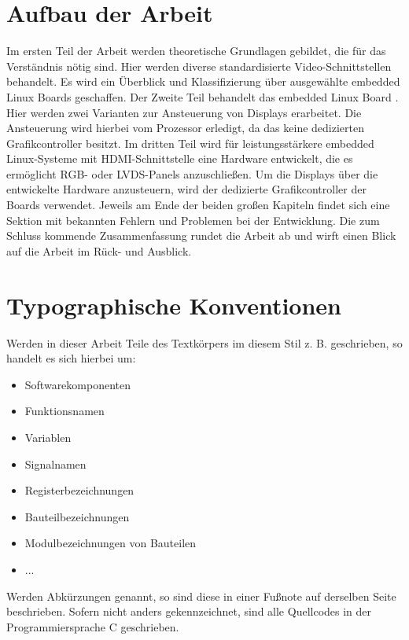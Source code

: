\section{Aufbau der Arbeit}
Im ersten Teil der Arbeit werden theoretische Grundlagen gebildet, die für das Verständnis nötig sind. Hier werden diverse standardisierte Video-Schnittstellen behandelt. Es wird ein Überblick und Klassifizierung über ausgewählte embedded Linux Boards geschaffen.
Der Zweite Teil behandelt das embedded Linux Board . Hier werden zwei Varianten zur Ansteuerung von Displays erarbeitet. Die Ansteuerung wird hierbei vom Prozessor erledigt, da das  keine dedizierten Grafikcontroller besitzt.
Im dritten Teil wird für leistungsstärkere embedded Linux-Systeme mit HDMI-Schnittstelle eine Hardware entwickelt, die es ermöglicht RGB- oder LVDS-Panels anzuschließen. Um die Displays über die entwickelte Hardware anzusteuern, wird der dedizierte Grafikcontroller der Boards verwendet. Jeweils am Ende der beiden großen Kapiteln findet sich eine Sektion mit bekannten Fehlern und Problemen bei der Entwicklung. Die zum Schluss kommende Zusammenfassung rundet die Arbeit ab und wirft einen Blick auf die Arbeit im Rück- und Ausblick. 

\section{Typographische Konventionen}
Werden in dieser Arbeit Teile des Textkörpers im diesem Stil z. B.  geschrieben, so handelt es sich hierbei um:
\begin{itemize}
\item Softwarekomponenten
\item Funktionsnamen
\item Variablen
\item Signalnamen
\item Registerbezeichnungen
\item Bauteilbezeichnungen
\item Modulbezeichnungen von Bauteilen
\item ...
\end{itemize}
Werden Abkürzungen genannt, so sind diese in einer Fußnote auf derselben Seite beschrieben.
Sofern nicht anders gekennzeichnet, sind alle Quellcodes in der Programmiersprache C geschrieben.
